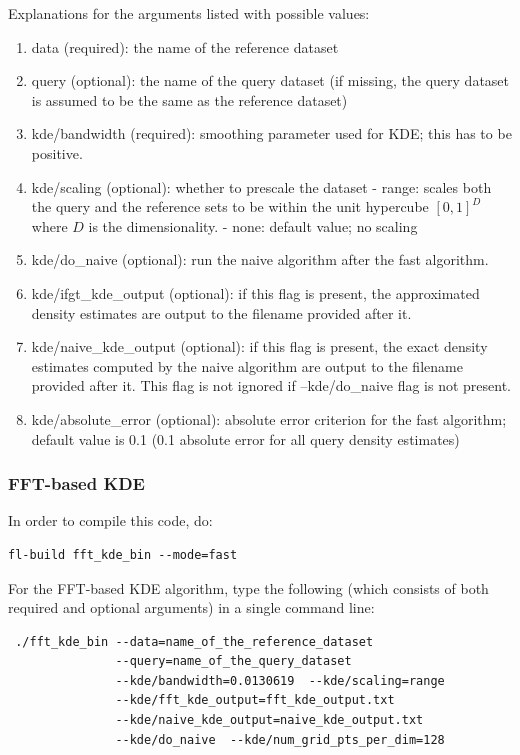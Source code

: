 \documentclass[letter]{report}
\begin{document}
Explanations for the arguments listed with possible values:

\begin{enumerate}
\item{data (required): the name of the reference dataset}
\item{query (optional): the name of the query dataset (if missing, the
 query dataset is assumed to be the same as the reference dataset)}
\item{kde/bandwidth (required): smoothing parameter used for KDE; this
 has to be positive.}
\item{kde/scaling (optional): whether to prescale the dataset - range:
scales both the query and the reference sets to be within the unit
hypercube $[0, 1]^D$ where $D$ is the dimensionality.  - none: default
value; no scaling}
\item{kde/do\_naive (optional): run the naive algorithm after the fast
algorithm.}
\item{kde/ifgt\_kde\_output (optional): if this flag is present, the
approximated density estimates are output to the filename provided
after it.}
\item{kde/naive\_kde\_output (optional): if this flag is present, the
 exact density estimates computed by the naive algorithm are output to
 the filename provided after it. This flag is not ignored if
 --kde/do\_naive flag is not present.}
\item{kde/absolute\_error (optional): absolute error criterion for the
 fast algorithm; default value is 0.1 (0.1 absolute error for all
 query density estimates)}
\end{enumerate}

\subsubsection{FFT-based KDE}
In order to compile this code, do: 
\begin{verbatim}
fl-build fft_kde_bin --mode=fast
\end{verbatim}
For the FFT-based KDE algorithm, type the
following (which consists of both required and optional arguments) in
a single command line:
\begin{verbatim}
 ./fft_kde_bin --data=name_of_the_reference_dataset
               --query=name_of_the_query_dataset
               --kde/bandwidth=0.0130619  --kde/scaling=range
               --kde/fft_kde_output=fft_kde_output.txt
               --kde/naive_kde_output=naive_kde_output.txt
               --kde/do_naive  --kde/num_grid_pts_per_dim=128
\end{verbatim}
\end{document}
